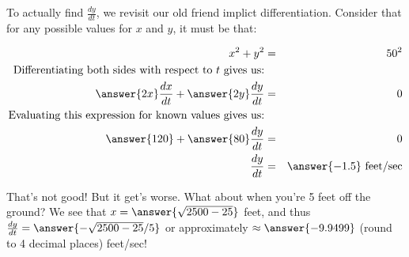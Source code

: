 \documentclass{ximera}
\begin{document}
\begin{question}
\begin{explanation}
\begin{image}
\end{image}

To actually find $\frac{dy}{dt}$, we revisit our old friend implict differentiation.  Consider that for any possible values for $x$ and $y$, it must be that:

\begin{eqnarray*}
x^2+ y^2 &=& 50^2\\
\text{Differentiating both sides with respect to $t$ gives us:}&&\\
\answer{2x}\frac{dx}{dt}+\answer{2y}\frac{dy}{dt}&=& 0\\
\text{Evaluating this expression for known values gives us:}\\
\answer{120}+\answer{80}\frac{dy}{dt}&=& 0\\
\frac{dy}{dt}&=& \answer{-1.5}\ \text{feet/sec}
\end{eqnarray*}

That's not good!  But it get's worse.  What about when you're 5 feet off the ground?  We see that $x=\answer{\sqrt{2500-25}}$ feet, and thus $\frac{dy}{dt}=\answer{-\sqrt{2500-25}/5}$ or approximately $\approx \answer{-9.9499}$ (round to 4 decimal places) feet/sec!


\end{explanation}

\end{question}
\end{document}
